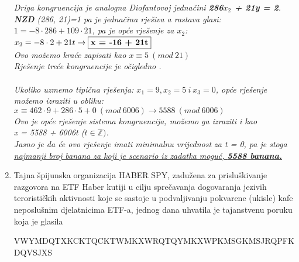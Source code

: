 \documentclass[12pt]{article}
\begin{document}
\begin{enumerate}
\begin{center}
               \vspace*{0.75cm}
            \textit{Driga kongruencija je analogna Diofantovoj jednačini \textbf{286$x_2$ + 21y = 2}.\\  \textbf{NZD} (286, 21)=1 pa je jednačina rješiva a rastava glasi: $1 = -8\cdot286 + 109\cdot21$, pa je opće rješenje za $x_2$:\\$x_2 = -8 \cdot 2 + 21t \rightarrow \textbf{\fbox{x = -16 + 21t}}$\\Ovo možemo kraće zapisati kao $x\equiv 5\ (mod\ 21)$\\}
            \vspace*{0.75cm}
            \textit{Rješenje treće kongruencije je očigledno \textbf{}.}\\
            \textit{\\Ukoliko uzmemo tipična rješenja: $x_1 = 9, x_2 = 5\ i\ x_3 = 0$, opće rješenje možemo izraziti u obliku:\\ $x\equiv 462\cdot9 + 286\cdot5 + 0\ (mod\ 6006) \rightarrow 5588\ (mod\ 6006)$\\Ovo je opće rješenje sistema kongruencija, možemo ga izraziti i kao \\x = 5588 + 6006t ($t \in \mathbb{Z})$.\\Jasno je da će ovo rješenje imati minimalnu vrijednost za t = 0, pa je stoga \underline{najmanji broj banana za koji je scenario iz zadatka moguć, \textbf{5588 banana.}}}
	    \end{center}
	    
	    \item Tajna špijunska organizacija HABER SPY, zadužena za prisluškivanje razgovora na ETF Haber kutiji u cilju sprečavanja dogovaranja jezivih terorističkih aktivnosti koje se sastoje u podvaljivanju pokvarene (ukisle) kafe neposlušnim djelatnicima ETF-a, jednog dana uhvatila je tajanstvenu poruku koja je glasila

VWYMDQTXKCKTQCKTWMKXWRQTQYMKXWPKMSGKMSJRQPFKDQVSJXS


\end{enumerate}
\end{document}
